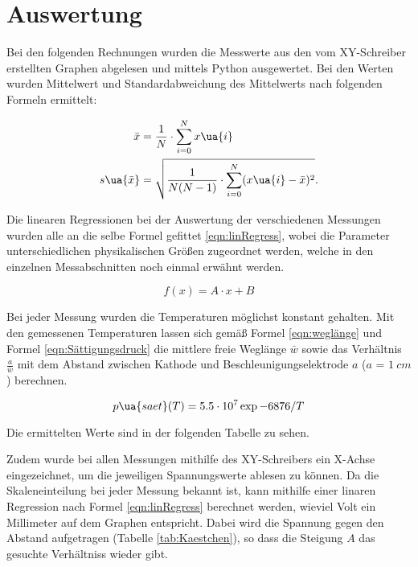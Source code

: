 \section{Auswertung}

Bei den folgenden Rechnungen wurden die Messwerte aus den vom XY-Schreiber erstellten
Graphen abgelesen und mittels Python ausgewertet. Bei den Werten wurden Mittelwert
und Standardabweichung des Mittelwerts nach folgenden Formeln ermittelt:

\begin{align}
  \bar{x}      &= \frac{1}{N} \cdot \sum_{i=0}^{N} x\ua{i}
  \label{eqn:Mittelwert} \\
  s\ua{\bar{x}} &= \sqrt{ \frac{1}{N(N-1)} \cdot \sum_{i=0}^{N} (x\ua{i} - \bar{x})^2  }.
  \label{eqn:Standardabweichung}
\end{align}

Die linearen Regressionen bei der Auswertung der verschiedenen Messungen wurden
alle an die selbe Formel gefittet \eqref{eqn:linRegress}, wobei die Parameter
unterschiedlichen physikalischen Größen zugeordnet werden, welche in den einzelnen
Messabschnitten noch einmal erwähnt werden.

\begin{equation}
  f(x) = A \cdot x + B
  \label{eqn:linRegress}
\end{equation}

Bei jeder Messung wurden die Temperaturen möglichst konstant gehalten. Mit den
gemessenen Temperaturen lassen sich gemäß Formel \eqref{eqn:weglänge} und Formel
\eqref{eqn:Sättigungsdruck} die mittlere freie
Weglänge $\bar{w}$ sowie das Verhältnis $\frac{a}{\bar{w}}$ mit dem Abstand zwischen
Kathode und Beschleunigungselektrode $a$ ($a$ = $\SI{1}{cm}$) berechnen.

\begin{equation}
  p\ua{saet}(T) = 5.5 \cdot 10^{7} \exp{-6876/T}
  \label{eqn:Sättigungsdruck}
\end{equation}

Die ermittelten Werte sind in der folgenden Tabelle zu sehen.



Zudem wurde bei allen Messungen mithilfe des XY-Schreibers ein X-Achse eingezeichnet,
um die jeweiligen Spannungswerte ablesen zu können. Da die Skaleneinteilung bei
jeder Messung bekannt ist, kann mithilfe einer linaren Regression nach Formel
\eqref{eqn:linRegress} berechnet werden, wieviel Volt ein Millimeter auf dem Graphen entspricht.
Dabei wird die Spannung gegen den Abstand aufgetragen (Tabelle
\ref{tab:Kaestchen}), so dass die Steigung $A$ das
gesuchte Verhältniss wieder gibt.

